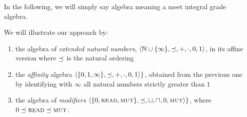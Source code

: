 \bez In the following, we will simply say algebra meaning a meet integral grade algebra. \eez

\begin{example}\label{ex:alg}
We will illustrate our approach by:
\begin{enumerate}
\item 
the algebra of \emph{extended natural numbers}, ${\langle \mathbb{N}\cup\{\infty\},\preceq,+,\cdot,0,1 \rangle}$, in its affine version where $\preceq$ is the natural ordering
\item the \emph{affinity} algebra $\langle \{0,1,\infty\},\preceq,+,\cdot,0,1 \rangle\}$, obtained from the previous one by identifying with $\infty$ all natural numbers strictly greater than $1$
\item  the algebra of \emph{modifiers} $\langle \{0,\textsc{read},\textsc{mut}\},\preceq,\sqcup,\sqcap,0,\textsc{mut} \rangle\}$, where $0\preceq\textsc{read}\preceq\textsc{mut}$.
\end{enumerate}
\end{example}




